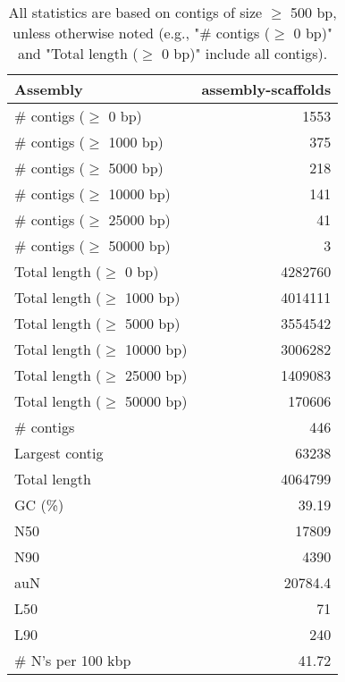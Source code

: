 \documentclass[12pt,a4paper]{article}
\begin{document}
\begin{table}[ht]
\begin{center}
\caption{All statistics are based on contigs of size $\geq$ 500 bp, unless otherwise noted (e.g., "\# contigs ($\geq$ 0 bp)" and "Total length ($\geq$ 0 bp)" include all contigs).}
\begin{tabular}{|l*{1}{|r}|}
\hline
Assembly & assembly-scaffolds \\ \hline
\# contigs ($\geq$ 0 bp) & 1553 \\ \hline
\# contigs ($\geq$ 1000 bp) & 375 \\ \hline
\# contigs ($\geq$ 5000 bp) & 218 \\ \hline
\# contigs ($\geq$ 10000 bp) & 141 \\ \hline
\# contigs ($\geq$ 25000 bp) & 41 \\ \hline
\# contigs ($\geq$ 50000 bp) & 3 \\ \hline
Total length ($\geq$ 0 bp) & 4282760 \\ \hline
Total length ($\geq$ 1000 bp) & 4014111 \\ \hline
Total length ($\geq$ 5000 bp) & 3554542 \\ \hline
Total length ($\geq$ 10000 bp) & 3006282 \\ \hline
Total length ($\geq$ 25000 bp) & 1409083 \\ \hline
Total length ($\geq$ 50000 bp) & 170606 \\ \hline
\# contigs & 446 \\ \hline
Largest contig & 63238 \\ \hline
Total length & 4064799 \\ \hline
GC (\%) & 39.19 \\ \hline
N50 & 17809 \\ \hline
N90 & 4390 \\ \hline
auN & 20784.4 \\ \hline
L50 & 71 \\ \hline
L90 & 240 \\ \hline
\# N's per 100 kbp & 41.72 \\ \hline
\end{tabular}
\end{center}
\end{table}
\end{document}
